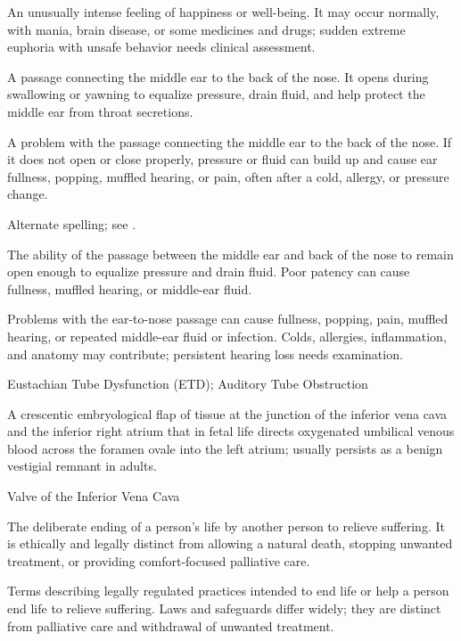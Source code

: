  An unusually intense feeling of happiness or well-being. It may occur normally, with mania, brain disease, or some medicines and drugs; sudden extreme euphoria with unsafe behavior needs clinical assessment.

 A passage connecting the middle ear to the back of the nose. It opens during swallowing or yawning to equalize pressure, drain fluid, and help protect the middle ear from throat secretions.

 A problem with the passage connecting the middle ear to the back of the nose. If it does not open or close properly, pressure or fluid can build up and cause ear fullness, popping, muffled hearing, or pain, often after a cold, allergy, or pressure change.

 Alternate spelling; see .

 The ability of the passage between the middle ear and back of the nose to remain open enough to equalize pressure and drain fluid. Poor patency can cause fullness, muffled hearing, or middle-ear fluid.

 Problems with the ear-to-nose passage can cause fullness, popping, pain, muffled hearing, or repeated middle-ear fluid or infection. Colds, allergies, inflammation, and anatomy may contribute; persistent hearing loss needs examination.

\synonyms
Eustachian Tube Dysfunction (ETD); Auditory Tube Obstruction

 A crescentic embryological flap of tissue at the junction of the inferior vena cava and the inferior right atrium that in fetal life directs oxygenated umbilical venous blood across the foramen ovale into the left atrium; usually persists as a benign vestigial remnant in adults.

\synonyms
Valve of the Inferior Vena Cava

 The deliberate ending of a person’s life by another person to relieve suffering. It is ethically and legally distinct from allowing a natural death, stopping unwanted treatment, or providing comfort-focused palliative care.

 Terms describing legally regulated practices intended to end life or help a person end life to relieve suffering. Laws and safeguards differ widely; they are distinct from palliative care and withdrawal of unwanted treatment.

